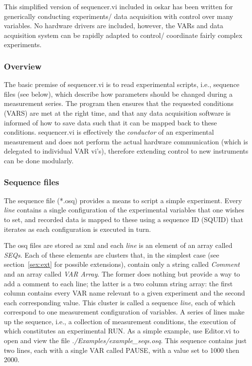 \documentclass[10pt,a4paper]{article}
\begin{document}
This simplified version of sequencer.vi included in oskar has been written for generically conducting experiments/ data acquisition with control over many variables.   No hardware drivers are included, however, the VARs and data acquisition system can be rapidly adapted to control/ coordinate fairly complex experiments.

\subsubsection{Overview}

The basic premise of sequencer.vi is to read experimental scripts, i.e., sequence files (see below), which describe how parameters should be changed during a measurement series.  The program then ensures that the requested conditions (VARS) are met at the right time, and that any data acquisition software is informed of how to save data such that it can be mapped back to these conditions.  sequencer.vi is effectively the \emph{conductor} of an experimental measurement and does not perform the actual hardware communication (which is delegated to individual VAR vi's), therefore extending control to new instruments can be done modularly.

\subsubsection{Sequence files}
The sequence file (*.osq) provides a means to script a simple experiment. Every \emph{line} contains a single configuration of the experimental variables that one wishes to set, and recorded data is mapped to these using a sequence ID (SQUID) that iterates as each configuration is executed in turn.

The osq files are stored as xml and each \emph{line} is an element of an array called \emph{SEQs}.  Each of these elements are clusters that, in the simplest case (see section~\ref{sex:ext} for possible extensions), contain only a string called \emph{Comment} and an array called \emph{VAR Array}. The former does nothing but provide a way to add a comment to each line; the latter is a two column string array: the first column contains every VAR name relevant to a given experiment and the second each corresponding value.  This cluster is called  a sequence \emph{line}, each of which correspond to one measurement configuration of variables.  A series of lines make up the sequence, i.e., a collection of measurement conditions, the execution of which constitutes an experimental RUN.  As a simple example, use Editor.vi to open and view the file \emph{./Examples/example\_seqs.osq}.  This sequence contains just two lines, each with a single VAR called PAUSE, with a value set to 1000 then 2000.
\end{document}
